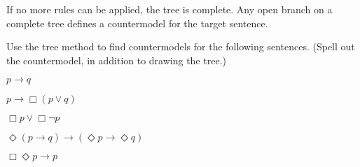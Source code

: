 If no more rules can be applied, the tree is complete. Any open branch on a
complete tree defines a countermodel for the target sentence.
%
\begin{exercise}
  Use the tree method to find countermodels for the following
  sentences. (Spell out the countermodel, in addition to drawing the tree.)
  \begin{exlist}
  \item $p\to q$ 
  \item $p \to \Box(p \lor q)$
  \item $\Box p \lor \Box \neg p$
  \item $\Diamond(p \to q) \to (\Diamond p \to \Diamond q)$
  \item $\Box \Diamond p \to p$ %
  \end{exlist}
\end{exercise}
